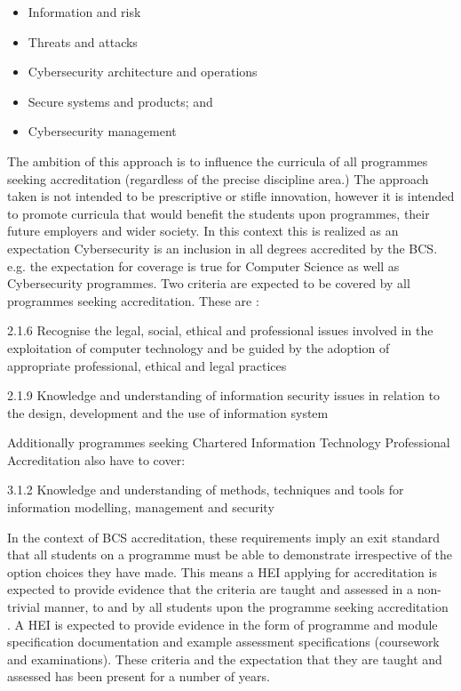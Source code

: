 \documentclass[conference]{IEEEtran}
\begin{document}
\begin{itemize}
    \item Information and risk 
    \item Threats and attacks 
    \item Cybersecurity architecture and operations
    \item Secure systems and products; and 
    \item Cybersecurity management
\end{itemize}

The ambition of this approach is to influence the curricula of all programmes seeking accreditation (regardless of the precise discipline area.)  The approach taken is not intended to be prescriptive or stifle innovation, however it is intended to promote curricula that would benefit the students upon programmes, their future employers and wider society.  In this context this is realized as an expectation Cybersecurity is an inclusion in all degrees accredited by the BCS. e.g. the expectation for coverage is true for Computer Science as well as Cybersecurity programmes. Two criteria are expected to be covered by all programmes seeking accreditation. These are \cite{BCS2018a}:

2.1.6 Recognise the legal, social, ethical and professional issues involved in the exploitation of computer technology and be guided by the adoption of appropriate professional, ethical and legal practices

2.1.9 Knowledge and understanding of information security issues in relation to the design, development and the use of information system

Additionally programmes seeking Chartered Information Technology Professional Accreditation also have to cover:

3.1.2 Knowledge and understanding of methods, techniques and tools for information modelling, management and security

In the context of BCS accreditation, these requirements imply an exit standard that all students on a programme must be able to demonstrate irrespective of the option choices they have made. This means a HEI applying for accreditation is expected to provide evidence that the criteria are taught and assessed in a non-trivial manner, to and by all students upon the programme seeking accreditation . A HEI is expected to provide evidence in the form of programme and module specification documentation and example assessment specifications (coursework and examinations). These criteria and the expectation that they are taught and assessed has been present for a number of years.
\end{document}
